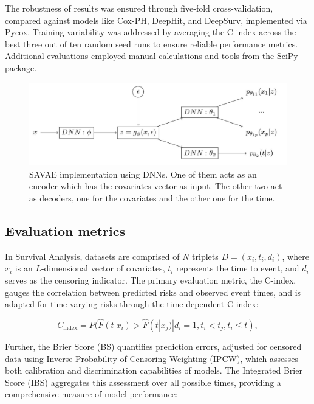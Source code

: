 \documentclass{article}
\begin{document}
The robustness of results was ensured through five-fold cross-validation, compared against models like Cox-PH, DeepHit, and DeepSurv, implemented via Pycox. Training variability was addressed by averaging the C-index across the best three out of ten random seed runs to ensure reliable performance metrics. Additional evaluations employed manual calculations and tools from the SciPy package.

\begin{figure}[H]
    \centering
    \includegraphics[width=13cm]{figures/DNN.png}
    \caption{SAVAE implementation using DNNs. One of them acts as an encoder which has the covariates vector as input. The other two act as decoders, one for the covariates and the other one for the time. }
    \label{DNN}

\end{figure}
\subsection{Evaluation metrics}
In Survival Analysis, datasets are comprised of \(N\) triplets \(D = (x_i, t_i, d_i)\), where \(x_i\) is an \(L\)-dimensional vector of covariates, \(t_i\) represents the time to event, and \(d_i\) serves as the censoring indicator. The primary evaluation metric, the C-index, gauges the correlation between predicted risks and observed event times, and is adapted for time-varying risks through the time-dependent C-index:


\begin{equation}
C_{\text{index}} = P(\hat{F}(t|x_i) > \hat{F}(t|x_j) | d_i = 1, t_i < t_j, t_i \leq t),
\end{equation}

Further, the Brier Score (BS) quantifies prediction errors, adjusted for censored data using Inverse Probability of Censoring Weighting (IPCW), which assesses both calibration and discrimination capabilities of models. The Integrated Brier Score (IBS) aggregates this assessment over all possible times, providing a comprehensive measure of model performance:
\end{document}
